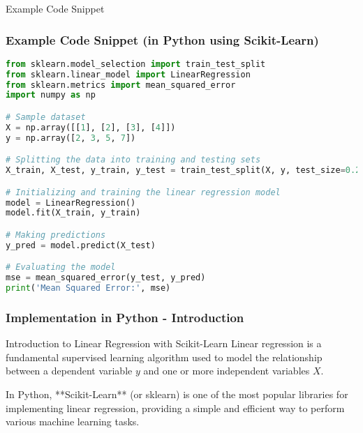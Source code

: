 \documentclass[aspectratio=169]{beamer}
\begin{document}
\begin{frame}[fragile]{Example Code Snippet}
    \frametitle{Example Code Snippet (in Python using Scikit-Learn)}
    \begin{lstlisting}[language=Python]
from sklearn.model_selection import train_test_split
from sklearn.linear_model import LinearRegression
from sklearn.metrics import mean_squared_error
import numpy as np

# Sample dataset
X = np.array([[1], [2], [3], [4]])
y = np.array([2, 3, 5, 7])

# Splitting the data into training and testing sets
X_train, X_test, y_train, y_test = train_test_split(X, y, test_size=0.2, random_state=42)

# Initializing and training the linear regression model
model = LinearRegression()
model.fit(X_train, y_train)

# Making predictions
y_pred = model.predict(X_test)

# Evaluating the model
mse = mean_squared_error(y_test, y_pred)
print('Mean Squared Error:', mse)
    \end{lstlisting}
\end{frame}

\begin{frame}[fragile]
    \frametitle{Implementation in Python - Introduction}
    \begin{block}{Introduction to Linear Regression with Scikit-Learn}
        Linear regression is a fundamental supervised learning algorithm used to model the relationship between a dependent variable \(y\) and one or more independent variables \(X\).
        
        In Python, **Scikit-Learn** (or sklearn) is one of the most popular libraries for implementing linear regression, providing a simple and efficient way to perform various machine learning tasks.
    \end{block}
\end{frame}
\end{document}
